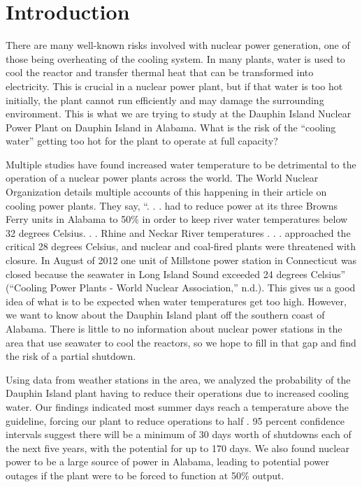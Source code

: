 \documentclass[
  letterpaper,
  DIV=11,
  numbers=noendperiod]{scrreprt}
\begin{document}

\chapter{Introduction}\label{introduction}

There are many well-known risks involved with nuclear power generation,
one of those being overheating of the cooling system. In many plants,
water is used to cool the reactor and transfer thermal heat that can be
transformed into electricity. This is crucial in a nuclear power plant,
but if that water is too hot initially, the plant cannot run efficiently
and may damage the surrounding environment. This is what we are trying
to study at the Dauphin Island Nuclear Power Plant on Dauphin Island in
Alabama. What is the risk of the ``cooling water'' getting too hot for
the plant to operate at full capacity?

Multiple studies have found increased water temperature to be
detrimental to the operation of a nuclear power plants across the world.
The World Nuclear Organization details multiple accounts of this
happening in their article on cooling power plants. They say, ``. . .
had to reduce power at its three Browns Ferry units in Alabama to 50\%
in order to keep river water temperatures below 32 degrees Celsius. . .
Rhine and Neckar River temperatures . . . approached the critical 28
degrees Celsius, and nuclear and coal-fired plants were threatened with
closure. In August of 2012 one unit of Millstone power station in
Connecticut was closed because the seawater in Long Island Sound
exceeded 24 degrees Celsius'' ({``Cooling Power Plants - World Nuclear
Association,''} n.d.). This gives us a good idea of what is to be
expected when water temperatures get too high. However, we want to know
about the Dauphin Island plant off the southern coast of Alabama. There
is little to no information about nuclear power stations in the area
that use seawater to cool the reactors, so we hope to fill in that gap
and find the risk of a partial shutdown.

Using data from weather stations in the area, we analyzed the
probability of the Dauphin Island plant having to reduce their
operations due to increased cooling water. Our findings indicated most
summer days reach a temperature above the guideline, forcing our plant
to reduce operations to half . 95 percent confidence intervals suggest
there will be a minimum of 30 days worth of shutdowns each of the next
five years, with the potential for up to 170 days. We also found nuclear
power to be a large source of power in Alabama, leading to potential
power outages if the plant were to be forced to function at 50\% output.
\end{document}
